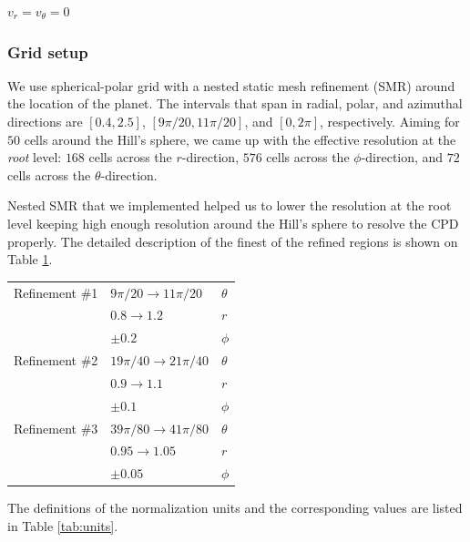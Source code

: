 \documentclass[twocolumn]{aastex631}
\begin{document}
$v_r=v_\theta=0$

\subsubsection{Grid setup}
We use spherical-polar grid with a nested static mesh refinement (SMR) around the location of the planet. The intervals that span in radial, polar, and azimuthal
directions are $[0.4, 2.5]$, $[9\pi/20, 11\pi/20]$, and $[0, 2\pi]$, respectively. Aiming for $50$ cells around the Hill's sphere, we came up with the 
effective resolution at the \emph{root} level: $168$ cells across the $r$-direction, $576$ cells across the $\phi$-direction, 
and $72$ cells across the $\theta$-direction.

Nested SMR that we implemented helped us to lower the resolution at the root level keeping high enough resolution around the Hill's 
sphere to resolve the CPD properly. The detailed description of the finest of the refined regions is shown on Table \ref{tab:smr}.
%
\begin{table}[]
    \label{tab:smr}
    \begin{tabular}{lll}
                   &                                 &          \\ \hline \hline
    Refinement \#1 & $9\pi/20 \rightarrow 11\pi/20$  & $\theta$ \\
                   & $0.8 \rightarrow 1.2$           & $r$      \\
                   & $\pm 0.2$                       & $\phi$   \\ \hline
    Refinement \#2 & $19\pi/40 \rightarrow 21\pi/40$ & $\theta$ \\
                   & $0.9 \rightarrow 1.1$           & $r$      \\
                   & $\pm 0.1$                       & $\phi$   \\ \hline
    Refinement \#3 & $39\pi/80 \rightarrow 41\pi/80$ & $\theta$ \\
                   & $0.95 \rightarrow 1.05$         & $r$      \\ \hline
                   & $\pm 0.05$                      & $\phi$  
    \end{tabular}
\end{table}
%
The definitions of the normalization units and the corresponding values are listed in Table \ref{tab:units}.
%
\end{document}

